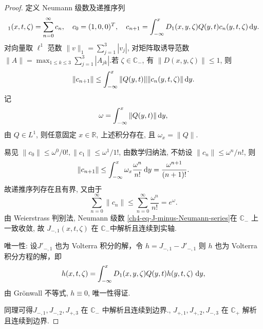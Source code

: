 \begin{proof}
    定义 Neumann 级数及递推序列
    \begin{equation}
        [J_{-}]_{1}(x,t,\zeta) = \sum_{n=0}^{\infty}c_{n},      \quad
        c_{0} = (1,0,0)^{T}, \quad c_{n+1}  = \int_{-\infty}^{x} D_{1}(x,y,\zeta) Q(y,t)c_{n}(y,t,\zeta) \rmd y.
        \label{ch4-eq-J-minus-Neumann-series}
    \end{equation}
    对向量取 $\ell^{1}$ 范数 $\|v\|_{1}=\sum_{j=1}^{3}|v_{j}|$, 对矩阵取诱导范数 $\|A\|=\max_{1\leq k\leq3}\sum_{j=1}^{3}|A_{jk}|$.若 $\zeta \in \mathbb{C}_{-}$, 有 $\|D(x,y,\zeta)\|\leq 1$, 则
    \begin{equation}
        \|c_{n+1}\| \leq \int_{-\infty}^{x} \|Q(y,t)\| \|c_{n}(y,t,\zeta)\| \mathop{}\!\mathrm{d} y.
    \end{equation}
    记
    \begin{equation}
        \omega = \int_{-\infty}^{x}\|Q(y,t)\|\mathop{}\!\mathrm{d} y,
    \end{equation}
    由 $Q \in L^{1}$, 则任意固定 $x \in \mathbb{R}$, 上述积分存在, 且 $\omega_{x} = \| Q \|$.

    易见 $\|c_{0}\| \leq \omega^{0}/0!, \| c_{1} \| \leq \omega^{1}/1!$, 由数学归纳法, 不妨设 $\| c_{n} \| \leq \omega^{n}/n!$, 则
    \begin{equation}
        \|c_{n+1}\| \leq \int_{-\infty}^{x} \omega_{x} \frac{\omega^{n}}{n!} \mathop{}\!\mathrm{d} y = \frac{\omega^{n+1}}{(n+1)!}.
    \end{equation}
    故递推序列存在且有界, 又由于
    \begin{equation}
        \sum_{n=0}^{\infty} \| c_{n} \| \leq \sum_{n=0}^{\infty} \frac{\omega^{n}}{n!} = e^{\omega}.
    \end{equation}
    由 Weierstrass 判别法, Neumann 级数 \eqref{ch4-eq-J-minus-Neumann-series}在 $\mathbb{C}_{-}$ 上一致收敛, 故 $J_{-,1}(x,t,\zeta)$ 在 $\mathbb{C}_{-}$中解析且连续到实轴.

    唯一性: 设$J'_{-,1}$ 也为 Volterra 积分的解，令 $h = J_{-,1} - J'_{-,1}$
    则 $h$ 也为 Volterra 积分方程的解，即
    \begin{equation}
        h(x,t,\zeta) = \int_{-\infty}^{x} D_{1}(x,y,\zeta) Q(y,t)h(y,t,\zeta)\,\mathop{}\!\mathrm{d} y,
        \label{ch4-eq-H-minus-first}
    \end{equation}
    由 Grönwall 不等式, $h \equiv 0$, 唯一性得证.

    同理可得$J_{-,1}, J_{-,2}, J_{+,3}$ 在 $\mathbb{C}_{-}$ 中解析且连续到边界., $J_{+,1}, J_{+,2}, J_{-,3}$ 在 $\mathbb{C}_{+}$ 解析且连续到边界.
\end{proof}
